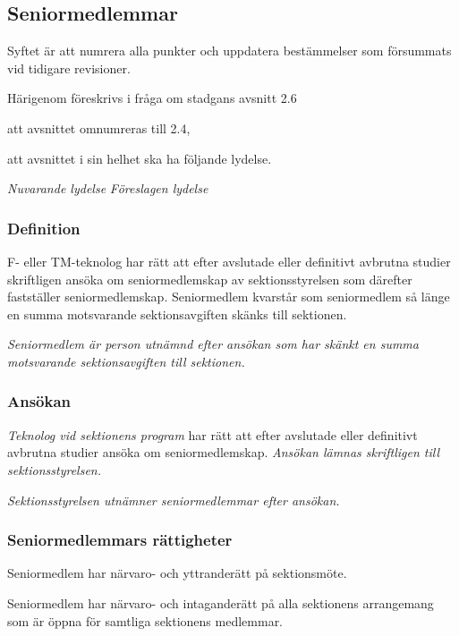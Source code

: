 \documentclass{article}
\newenvironment{lydelse}
    {\begin{paracol}{2}%
        \emph{Nuvarande lydelse}%
        \switchcolumn%
        \emph{Föreslagen lydelse}%
    \end{paracol}%
    \begin{enumerate}[label=\thesubsection.\arabic*]%
    \begin{paracol}{2}%
    }{\end{paracol}\end{enumerate}}
\newcommand{\itemb}{\item[\textbullet]}
\begin{document}
\subsection{Seniormedlemmar}
Syftet är att numrera alla punkter och uppdatera bestämmelser som försummats vid tidigare revisioner.

Härigenom föreskrivs i fråga om stadgans avsnitt 2.6
\begin{dels}
    \item att avsnittet omnumreras till 2.4,
    \item att avsnittet i sin helhet ska ha följande lydelse.
\end{dels}

\begin{lydelse}%
    \subsubsection*{Definition}
    \itemb F- eller TM-teknolog har rätt att efter avslutade eller definitivt avbrutna studier skriftligen ansöka om seniormedlemskap av sektionsstyrelsen som därefter fastställer seniormedlemskap. Seniormedlem kvarstår som senior\-med\-lem så länge en summa motsvarande sektionsavgiften skänks till sektionen.

\switchcolumn
  \setcounter{enumi}{0}
    \item \emph{Seniormedlem är person utnämnd efter ansökan som har skänkt en summa motsvarande sektionsavgiften till sektionen.}
    
    \subsubsection*{Ansökan}
  
    \item \emph{Teknolog vid sektionens program} har rätt att efter avslutade eller definitivt avbrutna studier ansöka om seniormedlemskap.
    \emph{Ansökan lämnas skriftligen till sektionsstyrelsen.}
  
    \item \emph{Sektionsstyrelsen utnämner seniormedlemmar efter ansökan.}
    
\switchcolumn*
    \subsubsection*{Seniormedlemmars rättigheter}%
    \itemb Seniormedlem har närvaro- och yttranderätt på sektionsmöte.

    \itemb Seniormedlem har närvaro- och intaganderätt på alla sektionens arrangemang som är öppna för samtliga sektionens medlemmar.


\end{lydelse}
\end{document}
